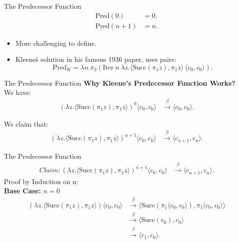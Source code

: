 \documentclass{beamer}
\begin{document}
\begin{frame}{The Predecessor Function}
  \begin{align*}
    \text{Pred}(0) &= 0, \\
    \text{Pred}(n + 1) &= n.
  \end{align*}
  \begin{itemize}
    \item More challenging to define.
    \item Kleene\'s solution in his famous 1936 paper, uses pairs:
    \[
      \text{Pred}_K = \lambda n. \pi_2 (\text{Iter} \ n \ \lambda z. \langle \text{Succ}(\pi_1 z), \pi_1 z \rangle \ \langle c_0, c_0 \rangle).
    \]
  \end{itemize}
\end{frame}
\begin{frame}{The Predecessor Function}
  \textbf{Why Kleene's Predecessor Function Works?}\\
  We have:
  \begin{align*}
    (\lambda z. \langle \text{Succ}(\pi_1 z), \pi_1 z \rangle)^0 \langle c_0, c_0 \rangle &\xrightarrow{\beta} \langle c_0, c_0 \rangle.
  \end{align*}
\begin{block}{We claim that:}
  \begin{align*}
    (\lambda z. \langle \text{Succ}(\pi_1 z), \pi_1 z \rangle)^{n+1} \langle c_0, c_0 \rangle &\xrightarrow{\beta} \langle c_{n+1}, c_n \rangle.
  \end{align*}
\end{block}
\end{frame}
\begin{frame}{The Predecessor Function}
    \begin{align*}Claim:
      (\lambda z. \langle \text{Succ}(\pi_1 z), \pi_1 z \rangle)^{n+1} \langle c_0, c_0 \rangle &\xrightarrow{\beta} \langle c_{n+1}, c_n \rangle.
    \end{align*}
  Proof by Induction on n:\\
  \textbf{Base Case:} \(n = 0\)\\
  \begin{align*}
    (\lambda z. \langle \text{Succ}(\pi_1 z), \pi_1 z \rangle) \langle c_0, c_0 \rangle &\xrightarrow{\beta} \langle \text{Succ}(\pi_1 \langle c_0, c_0 \rangle), \pi_1 \langle c_0, c_0 \rangle \rangle \\
    &\xrightarrow{\beta} \langle \text{Succ}(c_0), c_0 \rangle \\
    &\xrightarrow{\beta} \langle c_1, c_0 \rangle.
  \end{align*}
\end{frame}
\end{document}
